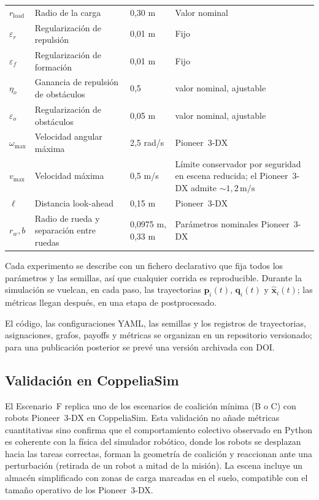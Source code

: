 \begin{table}[htbp]
\begin{tabularx}{\textwidth}{>{\ttfamily}p{}p{}p{}Y}
$r_{\mathrm{load}}$ & Radio de la carga & 0{,}30 m & Valor nominal \\
$\varepsilon_r$ & Regularización de repulsión & 0{,}01 m & Fijo \\
$\varepsilon_f$ & Regularización de formación & 0{,}01 m & Fijo \\
$\eta_o$ & Ganancia de repulsión de obstáculos & 0{,}5 & valor nominal, ajustable \\
$\varepsilon_o$ & Regularización de obstáculos & 0{,}05 m & valor nominal, ajustable \\
$\omega_{\max}$ & Velocidad angular máxima & 2{,}5 rad/s & Pioneer~3-DX \\
$v_{\max}$ & Velocidad máxima & 0{,}5 m/s & Límite conservador por seguridad en escena reducida; el Pioneer~3-DX admite ${\sim}1{,}2\,\text{m/s}$ \\
$\ell$ & Distancia look-ahead & 0{,}15 m & Pioneer~3-DX \\
$r_w,b$ & Radio de rueda y separación entre ruedas & 0{,}0975 m, 0{,}33 m & Parámetros nominales Pioneer~3-DX \\
\bottomrule
\end{tabularx}
\end{table}

Cada experimento se describe con un fichero declarativo que fija todos los parámetros
y las semillas, así que cualquier corrida es reproducible. Durante la simulación se
vuelcan, en cada paso, las trayectorias $\mathbf{p}_i(t)$, $\mathbf{q}_i(t)$ y
$\hat{\mathbf{x}}_i(t)$; las métricas llegan después, en una etapa de postprocesado.

El código, las configuraciones YAML, las semillas y los registros de trayectorias,
asignaciones, grafos, payoffs y métricas se organizan en un repositorio versionado;
para una publicación posterior se prevé una versión archivada con DOI.

\subsection{Validación en CoppeliaSim}

El Escenario~F replica uno de los escenarios de coalición mínima (B o C) con
robots Pioneer~3-DX en CoppeliaSim. Esta validación no añade métricas cuantitativas sino
confirma que el comportamiento colectivo observado en Python es coherente con la
física del simulador robótico, donde los robots se desplazan hacia las tareas correctas,
forman la geometría de coalición y reaccionan ante una perturbación (retirada de un
robot a mitad de la misión). La escena incluye un almacén simplificado con zonas de
carga marcadas en el suelo, compatible con el tamaño operativo de los Pioneer~3-DX.

